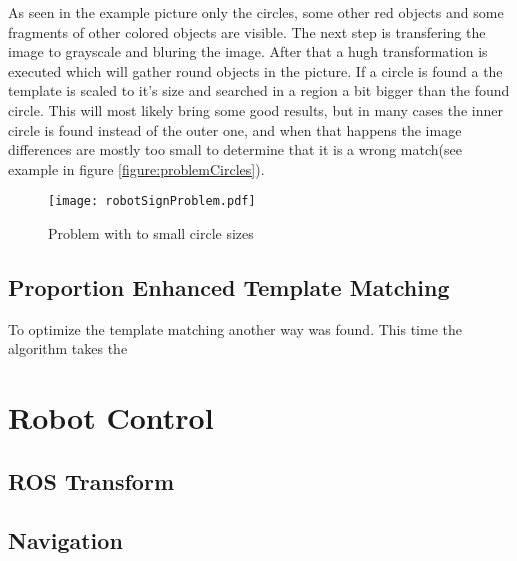 As seen in the example picture only the circles, some other red objects and some fragments of
other colored objects are visible. The next step is transfering the image to grayscale and 
bluring the image. After that a hugh transformation is executed which will gather round
objects in the picture. If a circle is found a the template is scaled to it's size and 
searched in a region a bit bigger than the found circle.
\newpage
This will most likely bring some good results, but in many cases the inner circle is found
instead of the outer one, and when that happens the image differences are mostly too small
to determine that it is a wrong match(see example in figure \vref{figure:problemCircles}).

\begin{figure}[htp]
\begin{center}
  \texttt{[image: robotSignProblem.pdf]}
  \caption{Problem with to small circle sizes}
  \label{figure:problemCircles}
\end{center}
\end{figure}

\subsection{Proportion Enhanced Template Matching}
To optimize the template matching another way was found. This time the algorithm takes the





\section{Robot Control}
\subsection{ROS Transform}
\subsection{Navigation}
